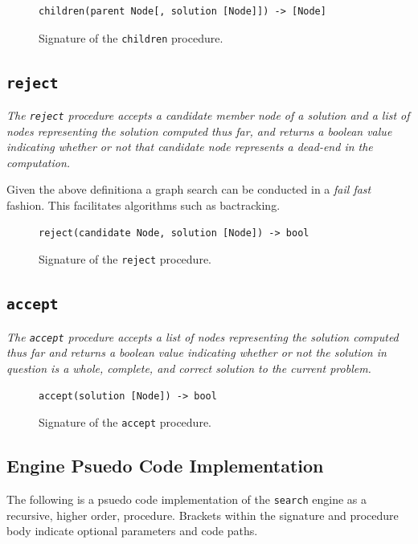 \documentclass[runningheads]{llncs}
\newcommand{\code}[1]{\texttt{#1}}
\begin{document}
\begin{figure}
\begin{lstlisting}
children(parent Node[, solution [Node]]) -> [Node]
\end{lstlisting}
\caption{Signature of the \code{children} procedure.}
\end{figure}

\subsection{\code{reject}}

\textit{The \code{reject} procedure accepts a candidate member node of a solution and a list of nodes representing the solution computed thus far, and returns a boolean value indicating whether or not that candidate node represents a dead-end in the computation.}

Given the above definitiona a graph search can be conducted in a \textit{fail fast} fashion. This facilitates algorithms such as bactracking.


\begin{figure}
\begin{lstlisting}
reject(candidate Node, solution [Node]) -> bool
\end{lstlisting}
\caption{Signature of the \code{reject} procedure.}
\end{figure}


\subsection{\code{accept}}

\textit{The \code{accept} procedure accepts a list of nodes representing the solution computed thus far and returns a boolean value indicating whether or not the solution in question is a whole, complete, and correct solution to the current problem.}

\begin{figure}
\begin{lstlisting}[xleftmargin=.2\textwidth]
accept(solution [Node]) -> bool
\end{lstlisting}
\caption{Signature of the \code{accept} procedure.}
\end{figure}

\subsection{Engine Psuedo Code Implementation}
The following is a psuedo code implementation of the \code{search} engine as a recursive, higher order, procedure. Brackets within the signature and procedure body indicate optional parameters and code paths.
\end{document}
